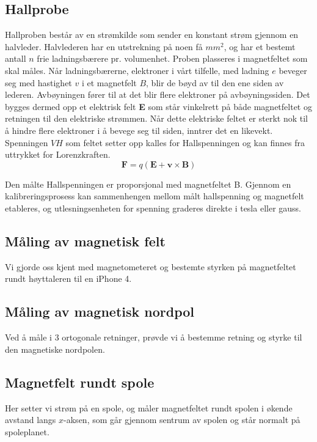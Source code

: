 \documentclass[12pt,norsk,a4paper]{article}
\begin{document}
\subsection{Hallprobe}

Hallproben består av en strømkilde som sender en konstant strøm gjennom en halvleder. Halvlederen har en utstrekning på noen få $mm^2$, og har et bestemt antall $n$ frie ladningsbærere pr. volumenhet. Proben plasseres i magnetfeltet som skal måles. Når ladningsbærerne, elektroner i vårt tilfelle, med ladning $e$ beveger seg med hastighet \textbf{$v$} i et magnetfelt \textbf{$B$}, blir de bøyd av til den ene siden av lederen. Avbøyningen fører til at det blir flere elektroner på avbøyningssiden. Det bygges dermed opp et elektrisk felt \textbf{E} som står vinkelrett på både magnetfeltet og retningen til den elektriske strømmen. Når dette elektriske feltet er sterkt nok til å hindre flere elektroner i å bevege seg til siden, inntrer det en likevekt. Spenningen $VH$ som feltet setter opp kalles for Hallspenningen og kan finnes fra uttrykket for Lorenzkraften.
\begin{equation}
\textbf{F} = q(\textbf{E} + \textbf{v} \times \textbf{B})
\end{equation}

Den målte Hallspenningen er proporsjonal med magnetfeltet B. Gjennom en
kalibreringsprosess kan sammenhengen mellom målt hallspenning og magnetfelt etableres, og
utlesningsenheten for spenning graderes  direkte i tesla  eller  gauss.


\subsection{Måling av magnetisk felt}
Vi gjorde oss kjent med magnetometeret og bestemte styrken på magnetfeltet rundt høyttaleren til en iPhone 4.

\subsection{Måling av magnetisk nordpol}
Ved å måle i 3 ortogonale retninger, prøvde vi å bestemme retning og styrke til den magnetiske nordpolen.


\subsection{Magnetfelt rundt spole}
Her setter vi strøm på en spole, og måler magnetfeltet rundt spolen i økende avstand langs $x$-aksen, som går gjennom sentrum av spolen og står normalt på spoleplanet.
\end{document}
